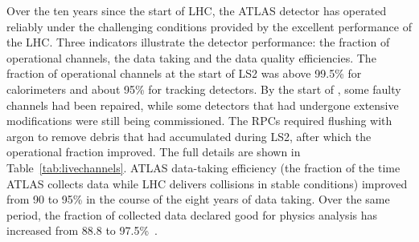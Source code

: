 \documentclass[cernpreprint, atlasdraft=false, UKenglish,british,orcidlogo, texmf, orcidlogo]{atlasdoc}
\begin{document}
Over the ten years since the start of \gls{LHC}, the ATLAS detector has operated reliably under the challenging conditions provided by the excellent performance of the \gls{LHC}. Three indicators illustrate the detector performance:
the fraction of operational channels, the data taking and the data quality efficiencies. The fraction of operational channels at the start of \gls{LS2} was above 99.5\% for calorimeters and about 95\% for tracking detectors. By the start of \RunThr, some faulty channels had been repaired, while some detectors that had undergone extensive modifications were still being commissioned. The \glspl{RPC} required flushing with argon to remove debris that had accumulated during \gls{LS2}, after which the operational fraction improved.
The full details are shown in Table~\ref{tab:livechannels}. ATLAS data-taking efficiency (the fraction of the time ATLAS collects data while
\gls{LHC} delivers collisions in stable conditions) improved from 90 to 95\% in the course of the eight years of data taking. Over the same period, the fraction of collected data declared good for physics analysis has increased from 88.8 to 97.5\%~\cite{DAPR-2018-01}.
 
\end{document}
